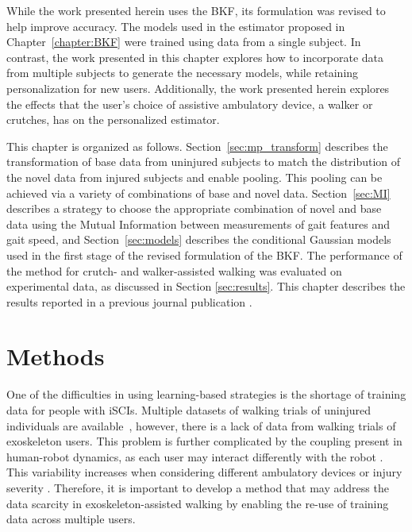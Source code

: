 While the work presented herein uses the BKF, its formulation was revised to help improve accuracy. The models used in the estimator proposed in Chapter~\ref{chapter:BKF} were trained using data from a single subject. In contrast, the work presented in this chapter explores how to incorporate data from multiple subjects to generate the necessary models, while retaining personalization for new users. Additionally, the work presented herein explores the effects that the user's choice of assistive ambulatory device, a walker or crutches, has on the personalized estimator.

This chapter is organized as follows. Section~\ref{sec:mp_transform} describes the transformation of base data from uninjured subjects to match the distribution of the novel data from injured subjects and enable pooling. This pooling can be achieved via a variety of combinations of base and novel data. Section~\ref{sec:MI} describes a strategy to choose the appropriate combination of novel and base data using the Mutual Information between measurements of gait features and gait speed, and Section~\ref{sec:models} describes the conditional Gaussian models used in the first stage of the revised formulation of the BKF. The performance of the method for crutch- and walker-assisted walking was evaluated on experimental data, as discussed in Section \ref{sec:results}. This chapter describes the results reported in a previous journal publication \cite{karulkar2022personalized}.

\section{Methods} 
One of the difficulties in using learning-based strategies is the shortage of training data for people with iSCIs. Multiple datasets of walking trials of uninjured individuals are available~\cite{hu2018benchmark,anguita2013public,fukuchi2018public}, however, there is a lack of data from walking trials of exoskeleton users. This problem is further complicated by the coupling present in human-robot dynamics, as each user may interact differently with the robot \cite{sylla2014assessing}. This variability increases when considering different ambulatory devices \cite{gambon2019characterizing} or injury severity \cite{gambon2020effects, rota2011walk}. Therefore, it is important to develop a method that may address the data scarcity in exoskeleton-assisted walking by enabling the re-use of training data across multiple users.


